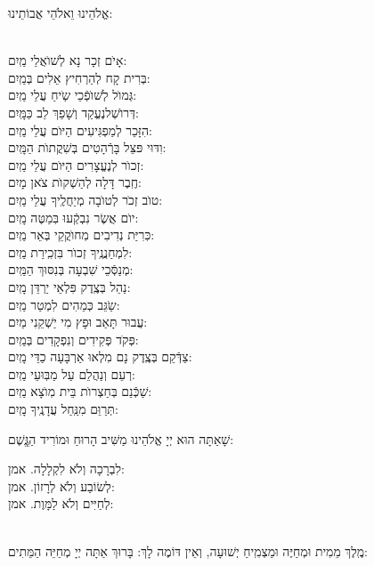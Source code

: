 \documentclass[twoside, openany, parskip=half, 11pt]{book}
\begin{document}
\begin{small}אֱלֹהֵינוּ וֵאלֹהֵי אֲבוֹתֵינוּ:\end{small}\\
אָיׂם זְכָר נָא לְשׁוׂאֲלֵי \hfill מַֽיִם:\\
בְּרִית קָח לְהַרְחִיץ אֵלִים \hfill בְּמַֽיִם:\\
גְּמוׂל לְשׁוׂפְֿכֵי שִֹֽיחַ עֲלֵי \hfill מַֽיִם:\\
דְּרוׂשְׁלנֶעֱקַד וְשָׁפַךְ לֵב \hfill כַּמָּֽיִם:\\
הִזָּכֵר לְמַפְגִּיעִים הַיּוׂם עֲלֵי \hfill מַֽיִם:\\
וִדּוּי פּצֵּל בָּרְֿהָטִים בְּשִׁקֲתוׂת \hfill הַמָּֽיִם:\\
זְכוׂר לְנֶעֱצָרִים הַיּוׂם עֲלֵי \hfill מַֽיִם:\\
חֶֽבֶר דָּלָה לְהַשְׁקוׂת צׂאן \hfill מָיִם:\\
טוׂב זְכׂר לְטוׂבָה מְיַחֲלֶֽיךָ עֲלֵי \hfill מַֽיִם:\\
יוׂם אֲשֶׂר נִבְקְֿעוּ בּֽמַטֶּה \hfill מָֽיִם:\\
כּֽרִיַּת נְדִיבִים מֽחוׂקֲקֵי בְּאֵר \hfill מַֽיִם:\\
לִמְחַנֲנֶֽיךָ זְכוׂר בִּזְכִֽירַת \hfill מַֽיִם:\\
מְנַסְּֿכֵי שִׁבְעָה בְּנִסּוּךְ \hfill הַמַּֽיִם:\\
נַהֵל בְּצֶֽדֶק פִּלְאֵי יַרְדֵּן \hfill מָֽיִם:\\
שַֹגֵּב כְּמֵהִים לִמְטַר \hfill מַֽיִם:\\
עֲבוּר תָּאַב וּפָץ מִי יַשְׁקֵנִי \hfill מַיִם:\\
פְּקׂד פְּקִידִים וְנִפְקָדִים \hfill בְּמַֽיִם:\\
צַדְּֿקֵם בְּצֶֽדֶק נָם מִלְאוּ אַרְבָּעָה כַדֵּי \hfill מָֽיִם:\\
רְעֵם וְנַהֲלֵם עַל מַבּֽוּעֵי \hfill מַֽיִם:\\
שַׁכְּֿנֵם בְּחַצְרוׂת בֵּית מֽוׂצָא \hfill מַֽיִם:\\
תְּרַוֵּם מִנַּֽחַל עֲדָנֶֽיךָ \hfill מָֽיִם:

שָׁאַתָּה הוּא יְיָ אֱלֹהֵינוּ מַשִּׁיב הָרוּחַ וּמוֹרִיד הַגֱּֽשֶׁם:

לִבְרָכָה וְלֹא לִקְלָלָה. \hfill אמן:\\
לְשׂוֹבַע וְלֹא לְרָזוֹן. \hfill אמן:\\
לְחַיִּים וְלֹא לַמָּוֶת. \hfill אמן:

\\
 מֶֽלֶךְ מֵמִית וּמְחַיֶּה וּמַצְמִֽיחַ יְשׁוּעָה, וְאֵין דּוֹמֶה לָךְ: בָּרוּךְ אַתָּה יְיָ מְחַיֵּה הַמֵּתִים:
\end{document}
